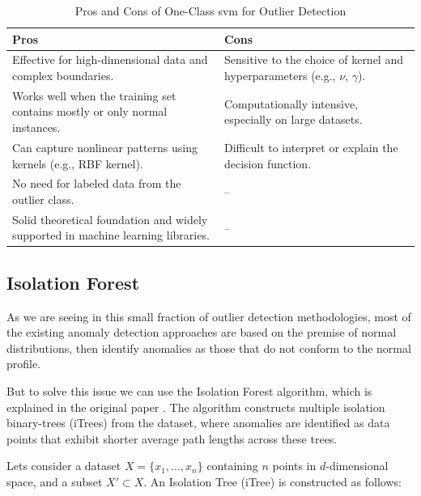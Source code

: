 \documentclass[11pt,english,a4paper,hidelinks]{book}
\begin{document}
\begin{table}[H]
    \centering
    \begin{tabular}{|p{7cm}|p{7cm}|}
        \hline
        \textbf{Pros} & \textbf{Cons} \\
            \hline
            Effective for high-dimensional data and complex boundaries. & Sensitive to the choice of kernel and hyperparameters (e.g., \(\nu\), \(\gamma\)). \\
            \hline
            Works well when the training set contains mostly or only normal instances. & Computationally intensive, especially on large datasets. \\
            \hline
            Can capture nonlinear patterns using kernels (e.g., RBF kernel). & Difficult to interpret or explain the decision function. \\
            \hline
            No need for labeled data from the outlier class. & -- \\
            \hline
            Solid theoretical foundation and widely supported in machine learning libraries. & -- \\
        \hline
    \end{tabular}
    \caption{Pros and Cons of One-Class \acrshort{svm} for Outlier Detection}
\end{table}
    
    
\subsection{Isolation Forest}

As we are seeing in this small fraction of outlier detection methodologies, most of the existing anomaly detection approaches are based on the premise of normal distributions, then identify anomalies as those that do not conform to the normal profile.

\vspace{0.5cm}
\noindent But to solve this issue we can use the Isolation Forest algorithm, which is explained in the original paper \textcite{liu2012isolation}. The algorithm constructs multiple isolation binary-trees (iTrees) from the dataset, where anomalies are identified as data points that exhibit shorter average path lengths across these trees.

\vspace{0.5cm}
\noindent Lets consider a dataset $X = \{x_1, \dots, x_n\}$ containing $n$ points in $d$-dimensional space, and a subset $X' \subset X$. An Isolation Tree (iTree) is constructed as follows:
\end{document}
